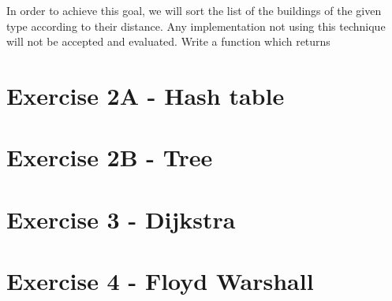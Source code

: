 \documentclass[10pt,a4paper]{article}
\begin{document}
In order to achieve this goal, we will sort the list of the buildings of the given type according to their distance. Any implementation not using this technique will not be accepted and evaluated. Write a function which returns

\section*{Exercise 2A - Hash table}

\section*{Exercise 2B - Tree}

\section*{Exercise 3 - Dijkstra}

\section*{Exercise 4 - Floyd Warshall}
\end{document}
